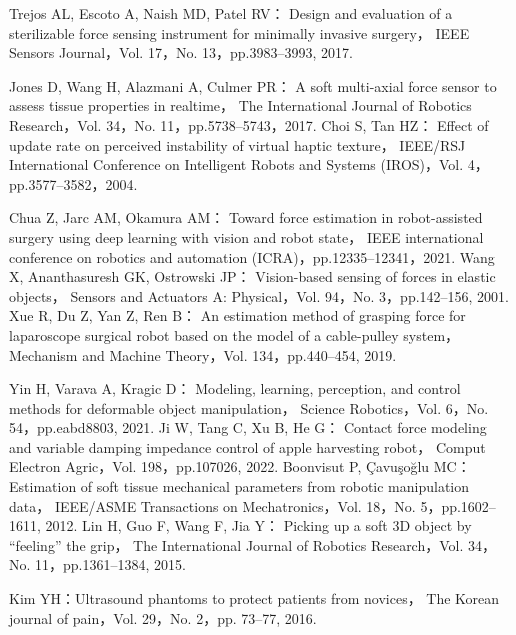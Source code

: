 \documentclass[a4paper]{jarticle}
\begin{document}
\begin{thebibliography}{9}
    Trejos AL, Escoto A, Naish MD, Patel RV：
    Design and evaluation of a sterilizable force sensing instrument for minimally invasive surgery，
    IEEE Sensors Journal，Vol. 17，No. 13，pp.3983–3993, 2017.






    Jones D, Wang H, Alazmani A, Culmer PR：
    A soft multi-axial force sensor to assess tissue properties in realtime，
    The International Journal of Robotics Research，Vol. 34，No. 11，pp.5738–5743，2017.
    Choi S, Tan HZ：
    Effect of update rate on perceived instability of virtual haptic texture，
    IEEE/RSJ International Conference on Intelligent Robots and Systems (IROS)，Vol. 4，pp.3577–3582，2004.

    Chua Z, Jarc AM, Okamura AM：
    Toward force estimation in robot-assisted surgery using deep learning with vision and robot state，
    IEEE international conference on robotics and automation (ICRA)，pp.12335–12341，2021.
    Wang X, Ananthasuresh GK, Ostrowski JP：
    Vision-based sensing of forces in elastic objects，
    Sensors and Actuators A: Physical，Vol. 94，No. 3，pp.142–156, 2001.
    Xue R, Du Z, Yan Z, Ren B：
    An estimation method of grasping force for laparoscope surgical robot based on the model of a cable-pulley system，
    Mechanism and Machine Theory，Vol. 134，pp.440–454, 2019.


    Yin H, Varava A, Kragic D：
    Modeling, learning, perception, and control methods for deformable object manipulation，
    Science Robotics，Vol. 6，No. 54，pp.eabd8803, 2021.
    Ji W, Tang C, Xu B, He G：
    Contact force modeling and variable damping impedance control of apple harvesting robot，
    Comput Electron Agric，Vol. 198，pp.107026, 2022.
    Boonvisut P, Çavuşoğlu MC：
    Estimation of soft tissue mechanical parameters from robotic manipulation data，
    IEEE/ASME Transactions on Mechatronics，Vol. 18，No. 5，pp.1602–1611, 2012.
    Lin H, Guo F, Wang F, Jia Y：
    Picking up a soft 3D object by “feeling” the grip，
    The International Journal of Robotics Research，Vol. 34，No. 11，pp.1361–1384, 2015.

    Kim YH：Ultrasound phantoms to protect patients from novices，
    The Korean journal of pain，Vol. 29，No. 2，pp. 73–77, 2016.


\end{thebibliography}
\end{document}
